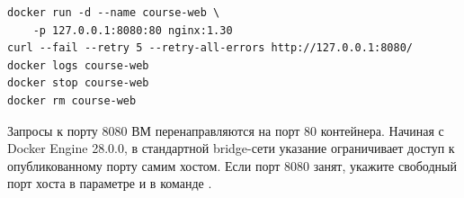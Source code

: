 \par\addvspace{10pt}\noindent\begin{minipage}{\linewidth}
\begin{verbatim}
docker run -d --name course-web \
    -p 127.0.0.1:8080:80 nginx:1.30
curl --fail --retry 5 --retry-all-errors http://127.0.0.1:8080/
docker logs course-web
docker stop course-web
docker rm course-web
\end{verbatim}
\end{minipage}\par\addvspace{10pt}

Запросы к порту 8080 ВМ перенаправляются на порт 80 контейнера. Начиная с Docker Engine 28.0.0, в стандартной bridge-сети указание  ограничивает доступ к опубликованному порту самим хостом. Если порт 8080 занят, укажите свободный порт хоста в параметре  и в команде .

